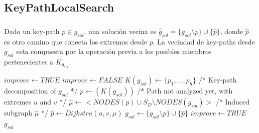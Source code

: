 \subsection{KeyPathLocalSearch}
\begin{frame}\frametitle{}
\begin{definition}
\begin{tiny}
Dado un key-path $p \in g_{sol}$, una solución vecina es 
${\hat{g}}_{sol} = \{g_{sol} \setminus p \} \cup \{\hat{p}\}$, 
donde $\hat{p}$ es otro camino que conecta los extremos desde $p$.  
La vecindad de key-paths desde $g_{sol}$ esta compuesta por la operación previa 
a los posibles miembros pertenecientes a $K_{g_{sol}}$. 
\end{tiny}
\end{definition}
\begin{block}{}
\begin{algorithm}[H]
\caption{$g_{sol} = KeyPathLocalSearch(G_B,C,g_{sol})$}
\begin{algorithmic}[1]
\begin{tiny}
\STATE $improve \leftarrow TRUE$
\STATE $improve \leftarrow FALSE$
\STATE $K(g_{sol}) \leftarrow \{p_1,\ldots,p_h\}$ /* Key-path decomposition of $g_{sol}$ */
\STATE $p \leftarrow(K(g_{sol}))$ /* Path not analyzed yet, with extremes $u$ and $v$ */
\STATE $\hat{\mu} \leftarrow <NODES(p) \cup S_D\setminus NODES(g_{sol}) > $ /* Induced subgraph $\hat{\mu}$ */
\STATE $\hat{p} \leftarrow Dijkstra(u,v,\hat{\mu})$
\STATE $g_{sol} \leftarrow \{ g_{sol}\setminus p \} \cup \{\hat{p}\}$
\STATE $improve \leftarrow TRUE$
\ENDIF
\ENDWHILE
\ENDWHILE
\RETURN $g_{sol}$
\end{tiny}
\end{algorithmic}
\end{algorithm}
\end{block}
\end{frame}

